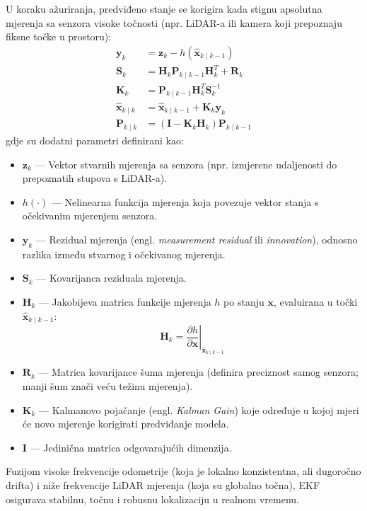 U koraku ažuriranja, predviđeno stanje se korigira kada stignu apsolutna mjerenja sa senzora visoke točnosti (npr. LiDAR-a ili kamera koji prepoznaju fiksne točke u prostoru):
\begin{align}
    \mathbf{y}_k &= \mathbf{z}_k - h(\mathbf{\hat{x}}_{k \mid k-1}) \\
    \mathbf{S}_k &= \mathbf{H}_k \mathbf{P}_{k \mid k-1} \mathbf{H}_k^T + \mathbf{R}_k \\
    \mathbf{K}_k &= \mathbf{P}_{k \mid k-1} \mathbf{H}_k^T \mathbf{S}_k^{-1} \\
    \mathbf{\hat{x}}_{k \mid k} &= \mathbf{\hat{x}}_{k \mid k-1} + \mathbf{K}_k \mathbf{y}_k \\
    \mathbf{P}_{k \mid k} &= (\mathbf{I} - \mathbf{K}_k \mathbf{H}_k) \mathbf{P}_{k \mid k-1}
\end{align}
gdje su dodatni parametri definirani kao:
\begin{itemize}
    \item $\mathbf{z}_k$ — Vektor stvarnih mjerenja sa senzora (npr. izmjerene udaljenosti do prepoznatih stupova s LiDAR-a).
    \item $h(\cdot)$ — Nelinearna funkcija mjerenja koja povezuje vektor stanja s očekivanim mjerenjem senzora.
    \item $\mathbf{y}_k$ — Rezidual mjerenja (engl. \textit{measurement residual} ili \textit{innovation}), odnosno razlika između stvarnog i očekivanog mjerenja.
    \item $\mathbf{S}_k$ — Kovarijanca reziduala mjerenja.
    \item $\mathbf{H}_k$ — Jakobijeva matrica funkcije mjerenja $h$ po stanju $\mathbf{x}$, evaluirana u točki $\mathbf{\hat{x}}_{k \mid k-1}$:
    \begin{equation}
        \mathbf{H}_k = \left. \frac{\partial h}{\partial \mathbf{x}} \right|_{\mathbf{\hat{x}}_{k \mid k-1}}
    \end{equation}
    \item $\mathbf{R}_k$ — Matrica kovarijance šuma mjerenja (definira preciznost samog senzora; manji šum znači veću težinu mjerenja).
    \item $\mathbf{K}_k$ — Kalmanovo pojačanje (engl. \textit{Kalman Gain}) koje određuje u kojoj mjeri će novo mjerenje korigirati predviđanje modela.
    \item $\mathbf{I}$ — Jedinična matrica odgovarajućih dimenzija.
\end{itemize}
Fuzijom visoke frekvencije odometrije (koja je lokalno konzistentna, ali dugoročno drifta) i niže frekvencije LiDAR mjerenja (koja su globalno točna), EKF osigurava stabilnu, točnu i robusnu lokalizaciju u realnom vremenu.

